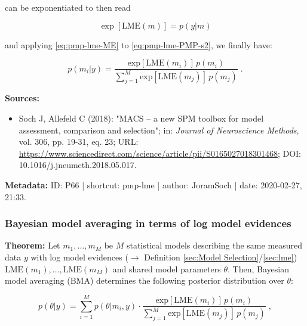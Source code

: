 \documentclass[a4paper,12pt]{book}
\begin{document}
can be exponentiated to then read

\begin{equation} \label{eq:pmp-lme-ME}
\exp\left[ \mathrm{LME}(m) \right] = p(y|m)
\end{equation}

and applying \eqref{eq:pmp-lme-ME} to \eqref{eq:pmp-lme-PMP-s2}, we finally have:

\begin{equation} \label{eq:pmp-lme-PMP-s3}
p(m_i|y) = \frac{\mathrm{exp}[\mathrm{LME}(m_i)] \, p(m_i)}{\sum_{j=1}^{M} \mathrm{exp}[\mathrm{LME}(m_j)] \, p(m_j)} \; .
\end{equation}

\vspace{1em}
\textbf{Sources:}
\begin{itemize}
\item Soch J, Allefeld C (2018): "MACS – a new SPM toolbox for model assessment, comparison and selection"; in: \textit{Journal of Neuroscience Methods}, vol. 306, pp. 19-31, eq. 23; URL: \url{https://www.sciencedirect.com/science/article/pii/S0165027018301468}; DOI: 10.1016/j.jneumeth.2018.05.017.
\end{itemize}


\vspace{1em}
\textbf{Metadata:} ID: P66 | shortcut: pmp-lme | author: JoramSoch | date: 2020-02-27, 21:33.


\subsubsection[\textbf{Bayesian model averaging in terms of log model evidences}]{Bayesian model averaging in terms of log model evidences} \label{sec:bma-lme}

\vspace{1em}
\textbf{Theorem:} Let $m_1, \ldots, m_M$ be $M$ statistical models describing the same measured data $y$ with log model evidences ($\rightarrow$ Definition \ref{sec:Model Selection}/\ref{sec:lme}) $\mathrm{LME}(m_1), \ldots, \mathrm{LME}(m_M)$ and shared model parameters $\theta$. Then, Bayesian model averaging (BMA) determines the following posterior distribution over $\theta$:

\begin{equation} \label{eq:bma-lme-BMA-LME}
p(\theta|y) = \sum_{i=1}^{M} p(\theta|m_i,y) \cdot \frac{\mathrm{exp}[\mathrm{LME}(m_i)] \, p(m_i)}{\sum_{j=1}^{M} \mathrm{exp}[\mathrm{LME}(m_j)] \, p(m_j)} \; ,
\end{equation}
\end{document}
